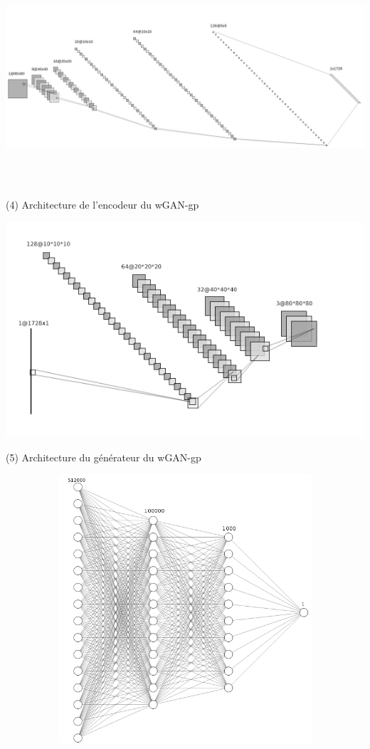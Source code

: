 \documentclass[12pt, oneside, a4paper, titlepage]{article}
\begin{document}
  
  \centerline{\includegraphics[width=15cm, height=8cm]{encoder.png}}
     \centerline{ (4) Architecture de l'encodeur du wGAN-gp}
  \centerline{\includegraphics[width=15cm, height=8cm]{generateur.jpg}}
     \centerline{ (5) Architecture du générateur du wGAN-gp}
  \centerline{\includegraphics[width=15cm, height=10cm]{discriminateur.png}}
\end{document}
